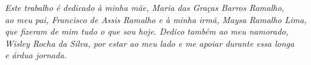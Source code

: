 \begin{dedicatoria}
   \vspace*{\fill}
   \centering
   \noindent
   \textit{Este trabalho é dedicado à minha mãe, Maria das Graças Barros Ramalho, \\
  	ao meu pai, Francisco de Assis Ramalho e à minha irmã, Maysa Ramalho Lima, \\
  	que fizeram de mim tudo o que sou hoje. Dedico também ao meu namorado, \\
  	Wisley Rocha da Silva, por estar ao meu lado e me apoiar durante essa longa \\
    e árdua jornada.} \vspace*{\fill}
\end{dedicatoria}
